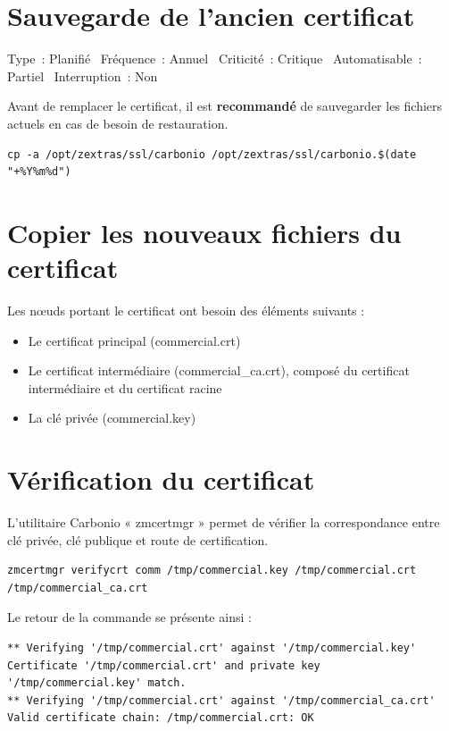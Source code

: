 \documentclass[11pt,a4paper]{report}
\begin{document}
\section{Sauvegarde de l'ancien certificat}
{\small\color{graytxt}%
Type~: Planifié \textbullet\ Fréquence~: Annuel \textbullet\ Criticité~: Critique \textbullet\ Automatisable~: Partiel \textbullet\ Interruption~: Non\par\vspace{4pt}}
Avant de remplacer le certificat, il est \textbf{recommandé} de
sauvegarder les fichiers actuels en cas de besoin de restauration.


\begin{lstlisting}
cp -a /opt/zextras/ssl/carbonio /opt/zextras/ssl/carbonio.$(date "+%Y%m%d")
\end{lstlisting}


\section{Copier les nouveaux fichiers du certificat}
Les nœuds portant le certificat ont besoin des éléments suivants :

\begin{itemize}[nosep]
  \item Le certificat principal (commercial.\allowbreak{}crt)
  \item Le certificat intermédiaire (commercial\_ca.\allowbreak{}crt), composé du certificat intermédiaire et du certificat racine
  \item La clé privée (commercial.\allowbreak{}key)
\end{itemize}



\section{Vérification du certificat}
L'utilitaire Carbonio « zmcertmgr » permet de vérifier la correspondance entre clé
privée, clé publique et route de certification.\allowbreak{}


\begin{lstlisting}
zmcertmgr verifycrt comm /tmp/commercial.key /tmp/commercial.crt /tmp/commercial_ca.crt
\end{lstlisting}
Le retour de la commande se présente ainsi :

\begin{lstlisting}
** Verifying '/tmp/commercial.crt' against '/tmp/commercial.key'
Certificate '/tmp/commercial.crt' and private key '/tmp/commercial.key' match.
** Verifying '/tmp/commercial.crt' against '/tmp/commercial_ca.crt'
Valid certificate chain: /tmp/commercial.crt: OK

\end{lstlisting}
\end{document}
